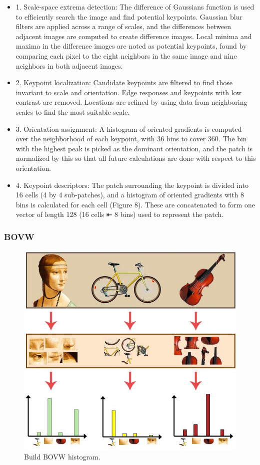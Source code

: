 \documentclass{article}
\begin{document}
\begin{itemize}
\item 1. Scale-space extrema detection: The difference of Gaussians function is used to efficiently search the image and find potential keypoints. Gaussian blur filters are applied across a range of scales, and the differences between adjacent images are computed to create difference images. Local minima and maxima in the difference images are noted as potential keypoints, found by comparing each pixel to the eight neighbors in the same image and nine neighbors in both adjacent images.
\item 2. Keypoint localization: Candidate keypoints are filtered to find those invariant to scale and orientation. Edge responses and keypoints with low contrast are removed. Locations are refined by using data from neighboring scales to find the most suitable scale.
\item 3. Orientation assignment: A histogram of oriented gradients is computed over the neighborhood of each keypoint, with 36 bins to cover 360. The bin with the highest peak is picked as the dominant orientation, and the patch is normalized by this so that all future calculations are done with respect to this orientation.
\item 4. Keypoint descriptors: The patch surrounding the keypoint is divided into 16 cells (4 by 4 sub-patches), and a histogram of oriented gradients with 8 bins is calculated for each cell (Figure 8). These are concatenated to form one vector of length 128 (16 cells ⇤ 8 bins) used to represent the patch.
\end{itemize}
\subsubsection{BOVW}
\begin{figure}
  \centering
  \includegraphics[scale=0.4]{report/pic/2/build_BOVW_histogram.jpeg} 
  \caption{Build BOVW histogram.}
\end{figure}
\end{document}
